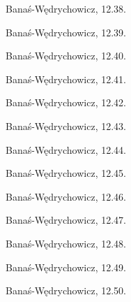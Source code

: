 \begin{integral}
    Banaś-Wędrychowicz, 12.38.
\end{integral}

\begin{integral}
    Banaś-Wędrychowicz, 12.39.
\end{integral}

\begin{integral}
    Banaś-Wędrychowicz, 12.40.
\end{integral}

\begin{integral}
    Banaś-Wędrychowicz, 12.41.
\end{integral}

\begin{integral}
    Banaś-Wędrychowicz, 12.42.
\end{integral}

\begin{integral}
    Banaś-Wędrychowicz, 12.43.
\end{integral}

\begin{integral}
    Banaś-Wędrychowicz, 12.44.
\end{integral}

\begin{integral}
    Banaś-Wędrychowicz, 12.45.
\end{integral}

\begin{integral}
    Banaś-Wędrychowicz, 12.46.
\end{integral}

\begin{integral}
    Banaś-Wędrychowicz, 12.47.
\end{integral}

\begin{integral}
    Banaś-Wędrychowicz, 12.48.
\end{integral}

\begin{integral}
    Banaś-Wędrychowicz, 12.49.
\end{integral}

\begin{integral}
    Banaś-Wędrychowicz, 12.50.
\end{integral}

